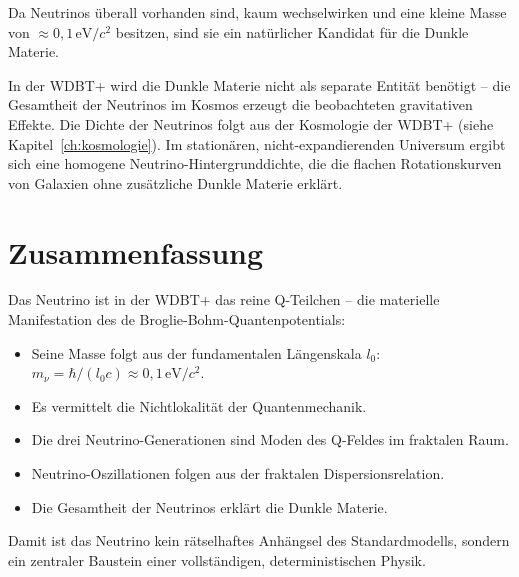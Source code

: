 Da Neutrinos überall vorhanden sind, kaum wechselwirken und eine kleine Masse von \( \approx 0,1 \, \text{eV}/c^2 \) besitzen, sind sie ein natürlicher Kandidat für die Dunkle Materie.

In der WDBT+ wird die Dunkle Materie nicht als separate Entität benötigt – die Gesamtheit der Neutrinos im Kosmos erzeugt die beobachteten gravitativen Effekte. Die Dichte der Neutrinos folgt aus der Kosmologie der WDBT+ (siehe Kapitel~\ref{ch:kosmologie}). Im stationären, nicht-expandierenden Universum ergibt sich eine homogene Neutrino-Hintergrunddichte, die die flachen Rotationskurven von Galaxien ohne zusätzliche Dunkle Materie erklärt.

\section{Zusammenfassung}
\label{sec:nu_zusammenfassung}

Das Neutrino ist in der WDBT+ das reine Q-Teilchen – die materielle Manifestation des de Broglie-Bohm-Quantenpotentials:

\begin{itemize}
    \item Seine Masse folgt aus der fundamentalen Längenskala \( l_0 \): \( m_\nu = \hbar/(l_0 c) \approx 0,1 \, \text{eV}/c^2 \).
    \item Es vermittelt die Nichtlokalität der Quantenmechanik.
    \item Die drei Neutrino-Generationen sind Moden des Q-Feldes im fraktalen Raum.
    \item Neutrino-Oszillationen folgen aus der fraktalen Dispersionsrelation.
    \item Die Gesamtheit der Neutrinos erklärt die Dunkle Materie.
\end{itemize}

Damit ist das Neutrino kein rätselhaftes Anhängsel des Standardmodells, sondern ein zentraler Baustein einer vollständigen, deterministischen Physik.
